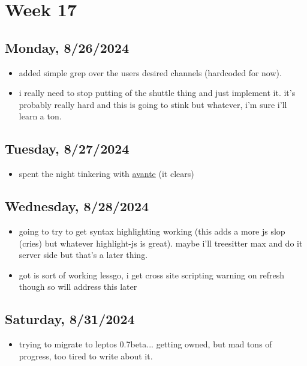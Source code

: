 \newpage
\section{Week 17}

\subsection*{Monday, 8/26/2024}
\begin{itemize}
    \item added simple grep over the users desired channels (hardcoded for now).
    \item i really need to stop putting of the shuttle thing and just implement
        it. it's probably really hard and this is going to stink but whatever,
        i'm sure i'll learn a ton.
\end{itemize}

\subsection*{Tuesday, 8/27/2024}
\begin{itemize}
    \item spent the night tinkering with 
        \textcolor{blue}{\href{https://github.com/yetone/avante.nvim}{avante}} 
        (it clears)
\end{itemize}

\subsection*{Wednesday, 8/28/2024}
\begin{itemize}
    \item going to try to get syntax highlighting working (this adds a more js
        slop (cries) but whatever highlight-js is great). maybe i'll treesitter
        max and do it server side but that's a later thing.
    \item got is sort of working lessgo, i get cross site scripting warning on
        refresh though so will address this later
\end{itemize}

\subsection*{Saturday, 8/31/2024}
\begin{itemize}
    \item trying to migrate to leptos 0.7beta... getting owned, but mad tons of
        progress, too tired to write about it.
\end{itemize}
